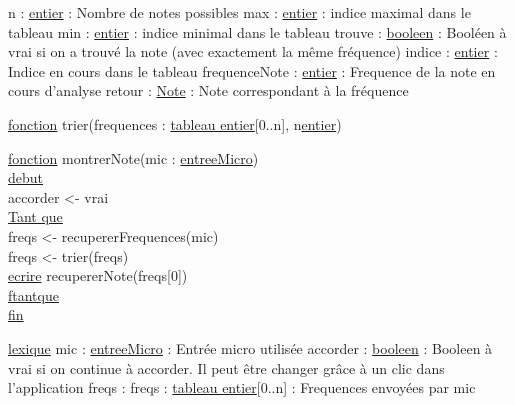 n :  \ul{entier} : Nombre de notes possibles\newline
max : \ul{entier} : indice maximal dans le tableau\newline
min : \ul{entier} : indice minimal dans le tableau\newline
trouve : \ul{booleen} : Booléen à vrai si on a trouvé la note (avec exactement la même fréquence)\newline
indice : \ul{entier} : Indice en cours dans le tableau\newline
frequenceNote : \ul{entier} : Frequence de la note en cours d'analyse\newline
retour : \ul{Note} : Note correspondant à la fréquence\newline


\begin{tabbing}
\ul{fonction} trier(frequences : \ul{tableau entier}[0..n], n\ul{entier})
\end{tabbing}


\begin{tabbing}
\ul{fonction} montrerNote(mic : \ul{entreeMicro})\\
\ul{debut}\\
accorder <- vrai\\
\ul{Tant que}\\
freqs <- recupererFrequences(mic)\\
freqs <- trier(freqs)\\
\ul{ecrire} recupererNote(freqs[0])\\
\ul{ftantque}\\
\ul{fin}\\
\end{tabbing}

\ul{lexique}\newline
mic : \ul{entreeMicro} : Entrée micro utilisée\newline
accorder : \ul{booleen} : Booleen à vrai si on continue à accorder. Il peut être changer grâce à un clic dans l'application\newline
freqs : freqs : \ul{tableau entier}[0..n] : Frequences envoyées par mic\newline
\newline


